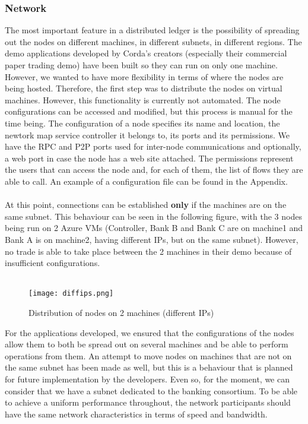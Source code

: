 \documentclass[12pt,twoside]{article}
\begin{document}
\subsubsection{Network}
The most important feature in a distributed ledger is the possibility of spreading out the nodes on different machines, in different subnets, in different regions. The demo applications developed by Corda's creators (especially their commercial paper trading demo) have been built so they can run on only one machine. However, we wanted to have more flexibility in terms of where the nodes are being hosted. Therefore, the first step was to distribute the nodes on virtual machines. However, this functionality is currently not automated. The node configurations can be accessed and modified, but this process is manual for the time being. The configuration of a node specifies its name and location, the newtork map service controller it belongs to, its ports and its permissions. We have the RPC and P2P ports used for inter-node communications and optionally, a web port in case the node has a web site attached. The permissions represent the users that can access the node and, for each of them, the list of flows they are able to call. An example of a configuration file can be found in the Appendix.
\\ \\
At this point, connections can be established \textbf{only} if the machines are on the same subnet. This behaviour can be seen in the following figure, with the 3 nodes being run on 2 Azure VMs (Controller, Bank B and Bank C are on machine1 and Bank A is on machine2, having different IPs, but on the same subnet). However, no trade is able to take place between the 2 machines in their demo because of insufficient configurations. \\ \\
\begin{figure}[H]
\centering
\texttt{[image: diffips.png]}
\caption{Distribution of nodes on 2 machines (different IPs)}
\centering
\label{fig:IPs}
\end{figure}
For the applications developed, we ensured that the configurations of the nodes allow them to both be spread out on several machines and be able to perform operations from them. An attempt to move nodes on machines that are not on the same subnet has been made as well, but this is a behaviour that is planned for future implementation by the developers. Even so, for the moment, we can consider that we have a subnet dedicated to the banking consortium. To be able to achieve a uniform performance throughout, the network participants should have the same network characteristics in terms of speed and bandwidth.
\end{document}
